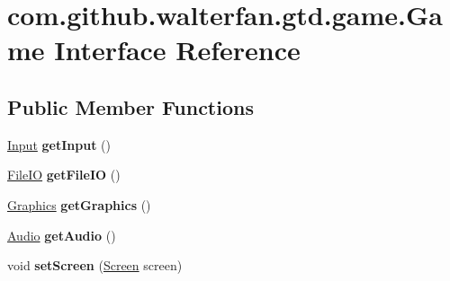 \hypertarget{interfacecom_1_1github_1_1walterfan_1_1gtd_1_1game_1_1Game}{\section{com.\-github.\-walterfan.\-gtd.\-game.\-Game Interface Reference}
\label{interfacecom_1_1github_1_1walterfan_1_1gtd_1_1game_1_1Game}
}
\subsection*{Public Member Functions}
\begin{DoxyCompactItemize}
\item 
\hypertarget{interfacecom_1_1github_1_1walterfan_1_1gtd_1_1game_1_1Game_a8223a3d81fd2cea0ed4cee4a4df11513}{\hyperlink{interfacecom_1_1github_1_1walterfan_1_1gtd_1_1game_1_1Input}{Input} {\bfseries get\-Input} ()}\label{interfacecom_1_1github_1_1walterfan_1_1gtd_1_1game_1_1Game_a8223a3d81fd2cea0ed4cee4a4df11513}

\item 
\hypertarget{interfacecom_1_1github_1_1walterfan_1_1gtd_1_1game_1_1Game_ac99ccf06e5a691b3a9192039951815d3}{\hyperlink{interfacecom_1_1github_1_1walterfan_1_1gtd_1_1game_1_1FileIO}{File\-I\-O} {\bfseries get\-File\-I\-O} ()}\label{interfacecom_1_1github_1_1walterfan_1_1gtd_1_1game_1_1Game_ac99ccf06e5a691b3a9192039951815d3}

\item 
\hypertarget{interfacecom_1_1github_1_1walterfan_1_1gtd_1_1game_1_1Game_afe089a82f3bfa3e3ea96c21c34996e09}{\hyperlink{interfacecom_1_1github_1_1walterfan_1_1gtd_1_1game_1_1Graphics}{Graphics} {\bfseries get\-Graphics} ()}\label{interfacecom_1_1github_1_1walterfan_1_1gtd_1_1game_1_1Game_afe089a82f3bfa3e3ea96c21c34996e09}

\item 
\hypertarget{interfacecom_1_1github_1_1walterfan_1_1gtd_1_1game_1_1Game_ade4d723432221e8867fcb1dda1200f99}{\hyperlink{classcom_1_1github_1_1walterfan_1_1gtd_1_1game_1_1Audio}{Audio} {\bfseries get\-Audio} ()}\label{interfacecom_1_1github_1_1walterfan_1_1gtd_1_1game_1_1Game_ade4d723432221e8867fcb1dda1200f99}

\item 
\hypertarget{interfacecom_1_1github_1_1walterfan_1_1gtd_1_1game_1_1Game_adad8888340f01d72f3efdfc57debcf69}{void {\bfseries set\-Screen} (\hyperlink{classcom_1_1github_1_1walterfan_1_1gtd_1_1game_1_1Screen}{Screen} screen)}\label{interfacecom_1_1github_1_1walterfan_1_1gtd_1_1game_1_1Game_adad8888340f01d72f3efdfc57debcf69}


\end{DoxyCompactItemize}
